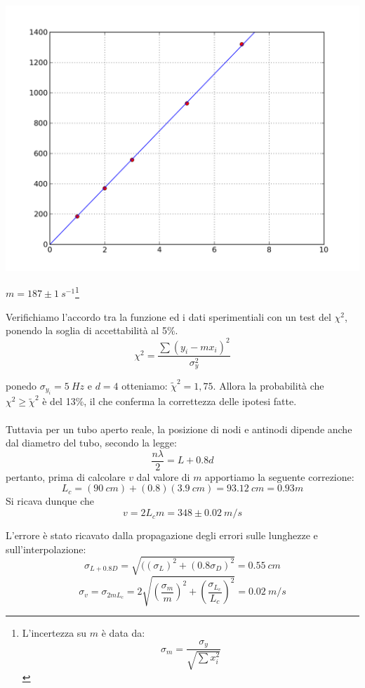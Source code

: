 \begin{center}
\includegraphics[scale=0.5]{../grafici/tubo/tubo1.png}

$m = 187\pm 1\ s^{-1}$\hspace{1cm}\footnote{L'incertezza su $m$ è data da: $$\sigma_m=\frac{\sigma_y}{\sqrt{\sum{x_i^2}}}$$}
\end{center}

Verifichiamo l'accordo tra la funzione ed i dati sperimentiali con un test del $\chi^2$, ponendo la soglia di accettabilità al 5\%.
\begin{equation}\label{chi2}
\chi^2=\displaystyle{\frac{\sum{(y_i-mx_i)^2}}{\sigma_{y}^2}}
\end{equation}

ponedo $\sigma_{y_i}=5\ Hz$ e $d=4$ otteniamo: $\tilde{\chi}^2=1,75$. Allora la probabilità che $\chi^2\geq\tilde{\chi}^2$ è del 13\%, il che conferma la correttezza delle ipotesi fatte.\\
\\
Tuttavia per un tubo aperto reale, la posizione di nodi e antinodi dipende anche dal diametro del tubo, secondo la legge:
$$\frac{n\lambda}{2}=L+0.8d$$ pertanto, prima di calcolare $v$ dal valore di $m$ apportiamo la seguente correzione:
$$ L_c = (90\ cm)+(0.8)(3.9\ cm) = 93.12\ cm = 0.93 m $$
Si ricava dunque che $$v=2L_cm=348\pm0.02\ m/s$$

L'errore è stato ricavato dalla propagazione degli errori sulle lunghezze e sull'interpolazione:
$$\sigma_{L+0.8D}=\sqrt{((\sigma_L)^2+(0.8\sigma_D)^2}=0.55\ cm$$
$$\sigma_v= \sigma_{2mL_c}= 2\sqrt{\left(\frac{\sigma_m}{m}\right)^2+\left(\frac{\sigma_{L_{c}}}{L_c}\right)^2}= 0.02\ m/s$$


